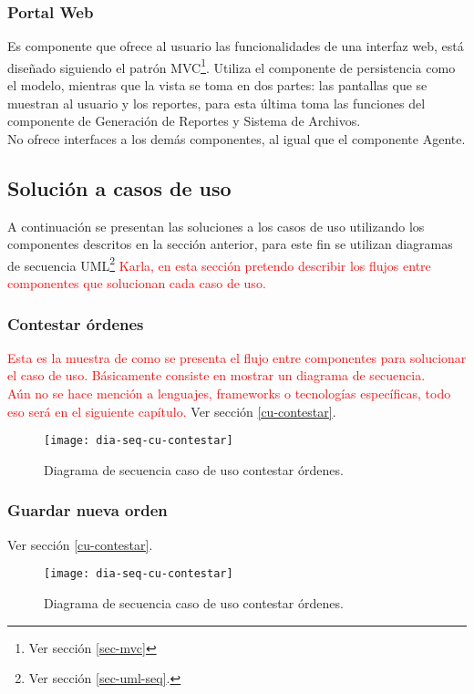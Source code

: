 \subsubsection{Portal Web}
Es componente que ofrece al usuario las funcionalidades de una interfaz web, está diseñado siguiendo el patrón MVC\footnote{Ver sección \ref{sec-mvc}}. Utiliza el componente de persistencia como el modelo, mientras que la vista se toma en dos partes: las pantallas que se muestran al usuario y los reportes, para esta última toma las funciones del componente de Generación de Reportes y Sistema de Archivos.\\
No ofrece interfaces a los demás componentes, al igual que el componente Agente.

\subsection{Solución a casos de uso}
A continuación se presentan las soluciones a los casos de uso utilizando los componentes descritos en la sección anterior, para este fin se utilizan diagramas de secuencia UML\footnote{Ver sección \ref{sec-uml-seq}.}
\textcolor{red}{Karla, en esta sección pretendo describir los flujos entre componentes que solucionan cada caso de uso.}

\subsubsection{Contestar órdenes}
\textcolor{red}{
	Esta es la muestra de como se presenta el flujo entre componentes para solucionar el caso de uso. Básicamente consiste en mostrar un diagrama de secuencia.\\
	Aún no se hace mención a lenguajes, frameworks o tecnologías específicas, todo eso será en el siguiente capítulo.
}
Ver sección \ref{cu-contestar}.\\
\begin{figure}[h]
	\centering
	\texttt{[image: dia-seq-cu-contestar]}
	\caption{Diagrama de secuencia caso de uso contestar órdenes.}
	\label{fig:dia-seq-cu-contestar}
\end{figure}
\iffalse
\subsubsection{Guardar nueva orden}
Ver sección \ref{cu-contestar}.\\
\begin{figure}[h]
	\centering
	\texttt{[image: dia-seq-cu-contestar]}
	\caption{Diagrama de secuencia caso de uso contestar órdenes.}
	\label{fig:dia-seq-cu-contestar}
\end{figure}
